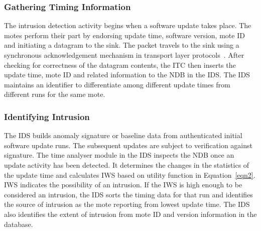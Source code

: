 \documentclass[conference,final]{IEEEtran}
\begin{document}
\subsubsection*{Gathering Timing Information}
\label{ssc:ga_info}
The intrusion detection activity begins when a software update takes place.
The motes perform their part by endorsing update time, software version, mote ID  and initiating a datagram to the sink. 
The packet travels to the sink using a synchronous acknowledgement mechanism in transport layer protocols~\cite{tep116}.
After checking for correctness of the datagram contents, the ITC then inserts the update time, mote ID and related information to the NDB in the IDS.
The IDS maintains an identifier to differentiate among different update times from different runs for the same mote.
%

\subsubsection*{Identifying Intrusion}
\label{ssc:cal_iws} 
The IDS builds anomaly signature or baseline data from authenticated initial software update runs. %
The subsequent updates are subject to verification against signature.
The time analyser module in the IDS inspects the NDB once an update activity has been detected.
It determines the changes in the statistics of the update time and calculates IWS based on utility function in Equation~\ref{eqn2}. IWS indicates the possibility of an intrusion. If the IWS is high enough to be considered an intrusion, the IDS sorts the timing data for that run and identifies the source of intrusion as the mote reporting from lowest update time.
The IDS also identifies the extent of intrusion from mote ID and version information in the database.
\end{document}
